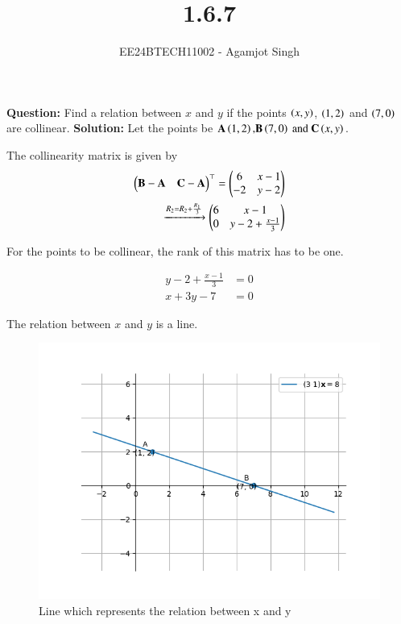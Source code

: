 \documentclass[journal]{IEEEtran}
\begin{document}

\vspace{3cm}

\title{1.6.7}
\author{EE24BTECH11002 - Agamjot Singh
}
{\let\newpage\relax\maketitle}

\renewcommand{\thefigure}{\theenumi}
\renewcommand{\thetable}{\theenumi}
\setlength{\intextsep}{10pt} %

\textbf{Question:}
\newline
Find a relation between $x$ and $y$ if the points $\left(x, y\right)$, $\left(1, 2\right)$ and $\left(7, 0\right)$ are collinear. 
\newline
\textbf{Solution:}
\newline
Let the points be $\mathbf{A}\left(1, 2\right) \text{,} \mathbf{B}\left(7, 0\right) \text{ and } \mathbf{C}\left(x, y\right)$.

The collinearity matrix is given by
\begin{align}
	\begin{pmatrix}\mathbf{B} - \mathbf{A} & \mathbf{C} - \mathbf{A}\end{pmatrix}^\top = \begin{pmatrix}6 & x - 1\\ -2 & y - 2\end{pmatrix}\\ 
													   \xrightarrow{R_2 = R_2 + \frac{R_1}{3}} \begin{pmatrix}6 & x - 1\\0 & y - 2 + \frac{x-1}{3}\end{pmatrix}
\end{align}

For the points to be collinear, the rank of this matrix has to be one.

\begin{align}
	y - 2 + \frac{x - 1}{3} &= 0\\
	x + 3y - 7 &= 0
\end{align}

The relation between $x$ and $y$ is a line.

\begin{figure}[h!]
   \centering
   \includegraphics[width=0.7\linewidth]{figs/graph.png}
   \caption{Line which represents the relation between x and y}
\end{figure}
\end{document}
